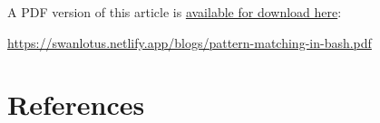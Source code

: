 \documentclass[
  a4paper,
]{article}
\begin{document}
\noindent A PDF version of this article is
\href{./pattern-matching-in-bash.pdf}{available for download here}:

\begin{small}

\begin{sffamily}

\url{https://swanlotus.netlify.app/blogs/pattern-matching-in-bash.pdf}

\end{sffamily}

\end{small}

\hypertarget{bibliography}{%
\section*{References}\label{bibliography}}
\end{document}

